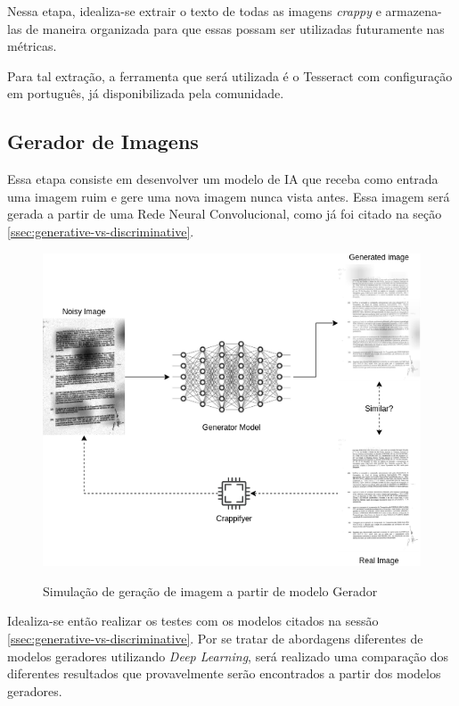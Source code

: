 Nessa etapa, idealiza-se extrair o texto de todas as imagens \textit{crappy} e armazena-las de maneira organizada para que essas possam ser utilizadas futuramente nas métricas.

Para tal extração, a ferramenta que será utilizada é o Tesseract com configuração em português, já disponibilizada pela comunidade.


\subsection{Gerador de Imagens}

Essa etapa consiste em desenvolver um modelo de IA que receba como entrada uma imagem ruim e gere uma nova imagem nunca vista antes. Essa imagem será gerada a partir de uma Rede Neural Convolucional, como já foi citado na seção \ref{ssec:generative-vs-discriminative}.

\begin{figure}[H]
  \centering
  \caption{Simulação de geração de imagem a partir de modelo Gerador}
  \includegraphics[scale=0.6]{figuras/image-generation.png}
  \label{fig:image-generation}
\end{figure}

Idealiza-se então realizar os testes com os modelos citados na sessão \ref{ssec:generative-vs-discriminative}. Por se tratar de abordagens diferentes de modelos geradores utilizando \textit{Deep Learning}, será realizado uma comparação dos diferentes resultados que provavelmente serão encontrados a partir dos modelos geradores.

